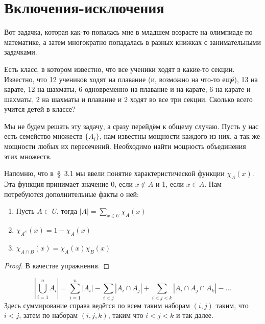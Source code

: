 \section{Включения-исключения}

Вот задачка, которая как-то попалась мне в младшем возрасте на олимпиаде по математике, а затем многократно попадалась в разных книжках с занимательными задачками.

Есть класс, в котором известно, что все ученики ходят в какие-то секции. Известно, что 12 учеников ходят на плавание (и, возможно на что-то ещё), 13 на карате, 12 на шахматы, 6 одновременно на плавание и на карате, 6 на карате и шахматы, 2 на шахматы и плавание и 2 ходят во все три секции. Сколько всего учится детей в классе?

Мы не будем решать эту задачу, а сразу перейдём к общему случаю. Пусть у нас есть семейство множеств $\{A_i\}$, нам известны мощности каждого из них, а так же мощности любых их пересечений. Необходимо найти мощность объединения этих множеств.

Напомню, что в~\S~3.1 мы ввели понятие характеристической функции $\chi_A(x)$. Эта функция принимает значение 0, если $x\not\in A$ и 1, если $x\in A$. Нам потребуются дополнительные факты о ней:

\begin{thm}
\begin{enumerate}
\item Пусть $A\subset U$, тогда $|A| = \sum_{x\in U} \chi_A(x)$
\item $\chi_{A^C}(x) = 1 - \chi_A(x)$
\item $\chi_{A\cap B}(x) = \chi_A(x)\chi_B(x)$ 
\end{enumerate}
\end{thm}
\begin{proof}
В качестве упражнения.
\end{proof}

\begin{thm}
$$\left|\bigcup_{i=1}^n A_i \right|= \sum_{i=1}^n|A_i| - \sum_{i<j}|A_i\cap A_j| + \sum_{i<j<k}|A_i\cap A_j\cap A_k| -\ldots$$
Здесь суммирование справа ведётся по всем таким наборам $(i, j)$ таким, что $i<j$, затем по наборам $(i,j,k)$, таким что $i<j<k$ и так далее.
\end{thm}

